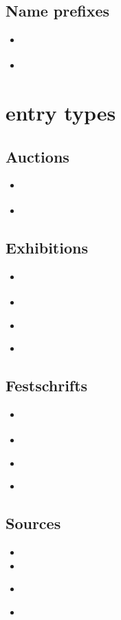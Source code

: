 \documentclass[a4paper,12pt]{scrartcl}
\begin{document}
\subsection{Name prefixes}
\begin{itemize}
    \item\cite{test::prefixnames::1}%
    \item{}%
\end{itemize}

\section{entry types}

\subsection{Auctions}
\begin{itemize}
    \item\cite{hesse:c:1995}%
    \item{}
\end{itemize}

\subsection{Exhibitions}
\begin{itemize}
    \item\cite{schaedler:1999}%
    \item{}%
    \item\cite{oberlechner:1999}%
    \item{}%
\end{itemize}


\subsection{Festschrifts}
\begin{itemize}
    \item\cite{kronsbein:siepen:2015}%
    \item{}%
    \item\cites{auler:hiller:2015a}%
    \item{}%
\end{itemize}

\subsection{Sources}
\begin{itemize}
    \item{}
    \item{}
    \item\cites{test::source}%
    \item{}%
\end{itemize}
\end{document}
